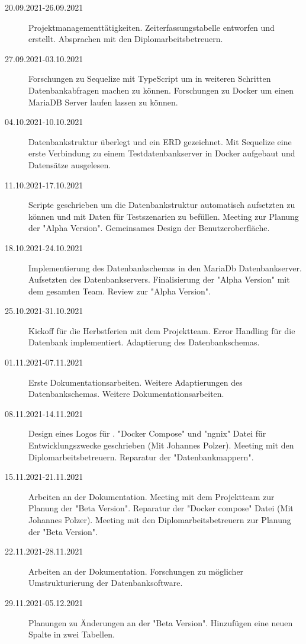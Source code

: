 
\begin{description}
    \item[20.09.2021-26.09.2021] Projektmanagementtätigkeiten. Zeiterfassungstabelle entworfen und erstellt. Absprachen mit den Diplomarbeitsbetreuern.
    \item[27.09.2021-03.10.2021] Forschungen zu Sequelize mit TypeScript um in weiteren Schritten Datenbankabfragen machen zu können. Forschungen zu Docker um einen MariaDB Server laufen lassen zu können.
    \item[04.10.2021-10.10.2021] Datenbankstruktur überlegt und ein ERD gezeichnet. Mit Sequelize eine erste Verbindung zu einem Testdatenbankserver in Docker aufgebaut und Datensätze ausgelesen.
    \item[11.10.2021-17.10.2021] Scripte geschrieben um die Datenbankstruktur automatisch aufsetzten zu können und mit Daten für Testszenarien zu befüllen. Meeting zur Planung der "Alpha Version". Gemeinsames Design der Benutzeroberfläche.
    \item[18.10.2021-24.10.2021] Implementierung des Datenbankschemas in den MariaDb Datenbankserver. Aufsetzten des Datenbankservers. Finalisierung der "Alpha Version" mit dem gesamten Team. Review zur "Alpha Version".
    \item[25.10.2021-31.10.2021] Kickoff für die Herbstferien mit dem Projektteam. Error Handling für die Datenbank implementiert. Adaptierung des Datenbankschemas.
    \item[01.11.2021-07.11.2021] Erste Dokumentationsarbeiten. Weitere Adaptierungen des Datenbankschemas. Weitere Dokumentationsarbeiten.
    \item[08.11.2021-14.11.2021] Design eines Logos für \ZELIA. "Docker Compose" und "ngnix" Datei für Entwicklungszwecke geschrieben (Mit Johannes Polzer). Meeting mit den Diplomarbeitsbetreuern. Reparatur der "Datenbankmappern". 
    \item[15.11.2021-21.11.2021] Arbeiten an der Dokumentation. Meeting mit dem Projektteam zur Planung der "Beta Version". Reparatur der "Docker compose" Datei (Mit Johannes Polzer). Meeting mit den Diplomarbeitsbetreuern zur Planung der "Beta Version".  
    \item[22.11.2021-28.11.2021] Arbeiten an der Dokumentation. Forschungen zu möglicher Umstrukturierung der Datenbanksoftware.
    \item[29.11.2021-05.12.2021] Planungen zu Änderungen an der "Beta Version". Hinzufügen eine neuen Spalte in zwei Tabellen. 

\end{description}
